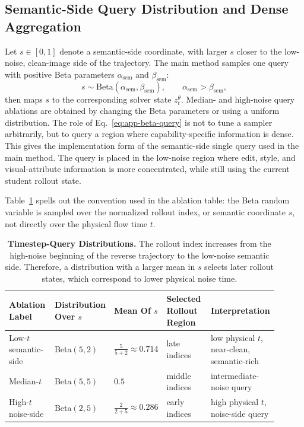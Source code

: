\documentclass{llmxive}
\begin{document}
\vspace{0.2cm}


\subsection{Semantic-Side Query Distribution and Dense Aggregation}
\label{app:query-impl}

Let $s\in[0,1]$ denote a semantic-side coordinate, with larger $s$ closer to the low-noise, clean-image side of the trajectory. The main method samples one query with positive Beta parameters $\alpha_{\mathrm{sem}}$ and $\beta_{\mathrm{sem}}$:
\begin{equation}
  s\sim \mathrm{Beta}(\alpha_{\mathrm{sem}},\beta_{\mathrm{sem}}),
  \qquad \alpha_{\mathrm{sem}}>\beta_{\mathrm{sem}},
  \label{eq:app-beta-query}
\end{equation}
then maps $s$ to the corresponding solver state $z_t^\theta$. Median- and high-noise query ablations are obtained by changing the Beta parameters or using a uniform distribution. The role of Eq.~\eqref{eq:app-beta-query} is not to tune a sampler arbitrarily, but to query a region where capability-specific information is dense. This gives the implementation form of the semantic-side single query used in the main method. The query is placed in the low-noise region where edit, style, and visual-attribute information is more concentrated, while still using the current student rollout state. 

Table~\ref{tab:beta-query-map} spells out the convention used in the ablation table: the Beta random variable is sampled over the normalized rollout index, or semantic coordinate $s$, not directly over the physical flow time $t$.

\begin{table}[t]
  \centering
  \footnotesize
  \setlength{\tabcolsep}{3pt}
  \vspace{-0.2cm}
  \begin{tabular}{@{}p{0.18\linewidth}p{0.19\linewidth}p{0.12\linewidth}p{0.18\linewidth}p{0.23\linewidth}@{}}
    \toprule
    \textbf{Ablation Label} & \textbf{Distribution Over $s$} & \textbf{Mean Of $s$} & \textbf{Selected Rollout Region} & \textbf{Interpretation}\\
    \midrule
    Low-$t$ semantic-side & Beta$(5,2)$ & $\frac{5}{5+2}\approx0.714$ & late indices & low physical $t$, near-clean, semantic-rich\\
    Median-$t$ & Beta$(5,5)$ & $0.5$ & middle indices & intermediate-noise query\\
    High-$t$ noise-side & Beta$(2,5)$ & $\frac{2}{2+5}\approx0.286$ & early indices & high physical $t$, noise-side query\\
    \bottomrule
  \end{tabular}
\caption{\textbf{Timestep-Query Distributions.} The rollout index increases from the high-noise beginning of the reverse trajectory to the low-noise semantic side. Therefore, a distribution with a larger mean in $s$ selects later rollout states, which correspond to lower physical noise time.}
\label{tab:beta-query-map}
\end{table}
\end{document}
